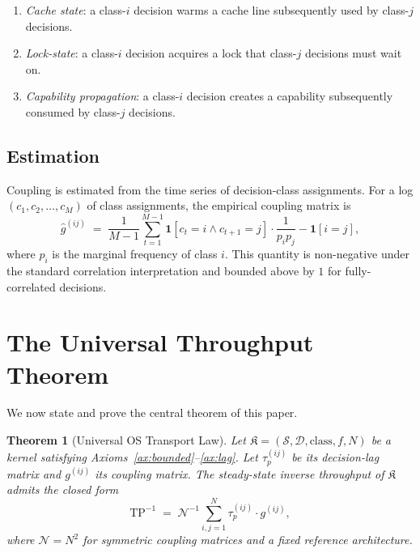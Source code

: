 \documentclass[twocolumn,11pt,a4paper]{article}
\newtheorem{theorem}{Theorem}[section]
\newcommand{\TP}{\mathrm{TP}}
\newcommand{\taup}{\tau_p}
\newcommand{\Norm}{\mathcal{N}}
\newcommand{\Kernel}{\mathfrak{K}}
\begin{document}
\begin{enumerate}[nosep,leftmargin=*]
\item \emph{Cache state}: a class-$i$ decision warms a cache line subsequently used by class-$j$ decisions.
\item \emph{Lock-state}: a class-$i$ decision acquires a lock that class-$j$ decisions must wait on.
\item \emph{Capability propagation}: a class-$i$ decision creates a capability subsequently consumed by class-$j$ decisions.
\end{enumerate}

\subsection{Estimation}

Coupling is estimated from the time series of decision-class assignments. For a log $(c_1, c_2, \ldots, c_M)$ of class assignments, the empirical coupling matrix is
\[
\hat{g}^{(ij)} \;=\; \frac{1}{M-1}\sum_{t=1}^{M-1} \mathbf{1}[c_t = i \wedge c_{t+1} = j] \cdot \frac{1}{p_i p_j} - \mathbf{1}[i = j],
\]
where $p_i$ is the marginal frequency of class $i$. This quantity is non-negative under the standard correlation interpretation and bounded above by $1$ for fully-correlated decisions.

\section{The Universal Throughput Theorem}
\label{sec:utl}

We now state and prove the central theorem of this paper.

\begin{theorem}[Universal OS Transport Law]
\label{thm:utl}
Let $\Kernel = (\mathcal{S}, \mathcal{D}, \mathrm{class}, f, N)$ be a kernel satisfying Axioms~\ref{ax:bounded}--\ref{ax:lag}. Let $\taup^{(ij)}$ be its decision-lag matrix and $g^{(ij)}$ its coupling matrix. The steady-state inverse throughput of $\Kernel$ admits the closed form
\begin{equation}
\TP^{-1} \;=\; \Norm^{-1}\sum_{i,j=1}^{N} \taup^{(ij)} \cdot g^{(ij)},
\label{eq:utl}
\end{equation}
where $\Norm = N^2$ for symmetric coupling matrices and a fixed reference architecture.
\end{theorem}
\end{document}
